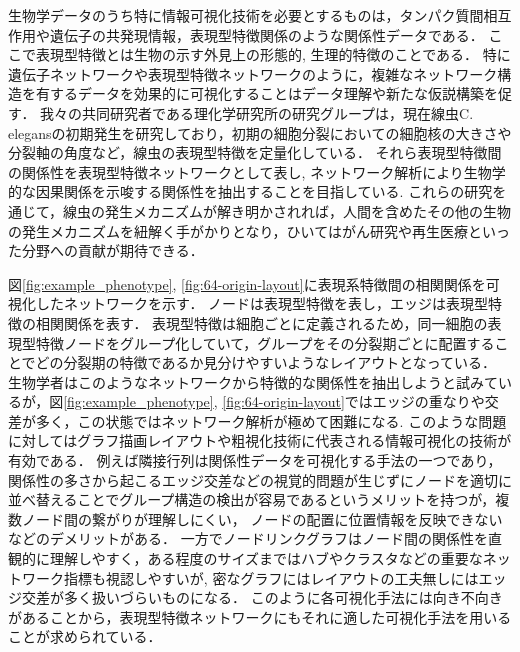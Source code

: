 \documentclass{kuee}
\begin{document}
生物学データのうち特に情報可視化技術を必要とするものは，タンパク質間相互作用や遺伝子の共発現情報，表現型特徴関係のような関係性データである．
ここで表現型特徴とは生物の示す外見上の形態的, 生理的特徴のことである．
特に遺伝子ネットワークや表現型特徴ネットワークのように，複雑なネットワーク構造を有するデータを効果的に可視化することはデータ理解や新たな仮説構築を促す．
我々の共同研究者である理化学研究所の研究グループは，現在線虫C. elegansの初期発生を研究しており，初期の細胞分裂においての細胞核の大きさや分裂軸の角度など，線虫の表現型特徴を定量化している．
それら表現型特徴間の関係性を表現型特徴ネットワークとして表し, ネットワーク解析により生物学的な因果関係を示唆する関係性を抽出することを目指している.
これらの研究を通じて，線虫の発生メカニズムが解き明かされれば，人間を含めたその他の生物の発生メカニズムを紐解く手がかりとなり，ひいてはがん研究や再生医療といった分野への貢献が期待できる．

図\ref{fig:example_phenotype}, \ref{fig:64-origin-layout}に表現系特徴間の相関関係を可視化したネットワークを示す．
ノードは表現型特徴を表し，エッジは表現型特徴の相関関係を表す．
表現型特徴は細胞ごとに定義されるため，同一細胞の表現型特徴ノードをグループ化していて，グループをその分裂期ごとに配置することでどの分裂期の特徴であるか見分けやすいようなレイアウトとなっている．
生物学者はこのようなネットワークから特徴的な関係性を抽出しようと試みているが，図\ref{fig:example_phenotype}, \ref{fig:64-origin-layout}ではエッジの重なりや交差が多く，この状態ではネットワーク解析が極めて困難になる.
このような問題に対してはグラフ描画レイアウトや粗視化技術に代表される情報可視化の技術が有効である．
例えば隣接行列は関係性データを可視化する手法の一つであり，関係性の多さから起こるエッジ交差などの視覚的問題が生じずにノードを適切に並べ替えることでグループ構造の検出が容易であるというメリットを持つが，複数ノード間の繋がりが理解しにくい，
ノードの配置に位置情報を反映できないなどのデメリットがある．
一方でノードリンクグラフはノード間の関係性を直観的に理解しやすく，ある程度のサイズまではハブやクラスタなどの重要なネットワーク指標も視認しやすいが, 密なグラフにはレイアウトの工夫無しにはエッジ交差が多く扱いづらいものになる．
このように各可視化手法には向き不向きがあることから，表現型特徴ネットワークにもそれに適した可視化手法を用いることが求められている．
\end{document}
